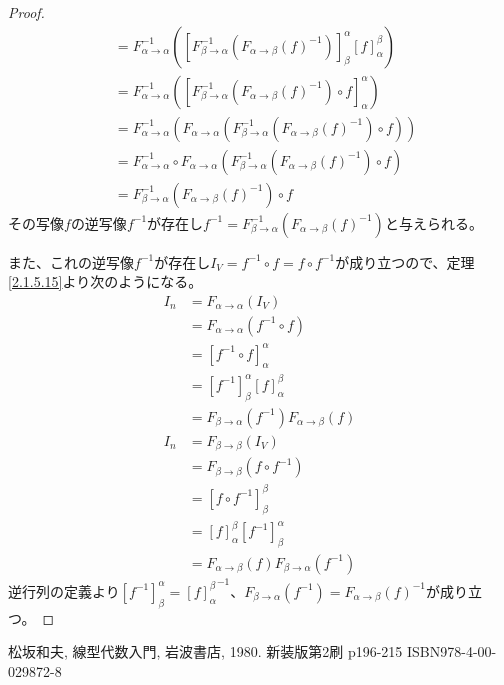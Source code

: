 \documentclass[dvipdfmx]{jsarticle}
\begin{document}
\begin{proof}
\begin{align*}
&= F_{\alpha \rightarrow \alpha}^{- 1}\left( \left[ F_{\beta \rightarrow \alpha}^{- 1}\left( {F_{\alpha \rightarrow \beta}(f)}^{- 1} \right) \right]^{\alpha}_{\beta}[ f]^{\beta}_{\alpha} \right)\\
&= F_{\alpha \rightarrow \alpha}^{- 1}\left( \left[ F_{\beta \rightarrow \alpha}^{- 1}\left( {F_{\alpha \rightarrow \beta}(f)}^{- 1} \right) \circ f \right]_{\alpha}^{\alpha} \right)\\
&= F_{\alpha \rightarrow \alpha}^{- 1}\left( F_{\alpha \rightarrow \alpha}\left( F_{\beta \rightarrow \alpha}^{- 1}\left( {F_{\alpha \rightarrow \beta}(f)}^{- 1} \right) \circ f \right) \right)\\
&= F_{\alpha \rightarrow \alpha}^{- 1} \circ F_{\alpha \rightarrow \alpha}\left( F_{\beta \rightarrow \alpha}^{- 1}\left( {F_{\alpha \rightarrow \beta}(f)}^{- 1} \right) \circ f \right)\\
&= F_{\beta \rightarrow \alpha}^{- 1}\left( {F_{\alpha \rightarrow \beta}(f)}^{- 1} \right) \circ f
\end{align*}
その写像$f$の逆写像$f^{- 1}$が存在し$f^{- 1} = F_{\beta \rightarrow \alpha}^{- 1}\left( {F_{\alpha \rightarrow \beta}(f)}^{- 1} \right)$と与えられる。\par
また、これの逆写像$f^{- 1}$が存在し$I_{V} = f^{- 1} \circ f = f \circ f^{- 1}$が成り立つので、定理\ref{2.1.5.15}より次のようになる。
\begin{align*}
I_{n} &= F_{\alpha \rightarrow \alpha}\left( I_{V} \right)\\
&= F_{\alpha \rightarrow \alpha}\left( f^{- 1} \circ f \right)\\
&= \left[ f^{- 1} \circ f \right]_{\alpha}^{\alpha}\\
&= \left[ f^{- 1} \right]^{\alpha}_{\beta}[ f]^{\beta}_{\alpha}\\
&= F_{\beta \rightarrow \alpha}\left( f^{- 1} \right)F_{\alpha \rightarrow \beta}(f)\\
I_{n} &= F_{\beta \rightarrow \beta}\left( I_{V} \right)\\
&= F_{\beta \rightarrow \beta}\left( f \circ f^{- 1} \right)\\
&= \left[ f \circ f^{-1} \right]_{\beta}^{\beta}\\
&= [ f]^{\beta}_{\alpha}\left[ f^{- 1} \right]^{\alpha}_{\beta}\\
&= F_{\alpha \rightarrow \beta}(f)F_{\beta \rightarrow \alpha}\left( f^{- 1} \right)
\end{align*}
逆行列の定義より$\left[ f^{- 1} \right]^{\alpha}_{\beta} = {[ f]^{\beta}_{\alpha}}^{- 1}$、$F_{\beta \rightarrow \alpha}\left( f^{- 1} \right) = {F_{\alpha \rightarrow \beta}(f)}^{- 1}$が成り立つ。
\end{proof}
\begin{thebibliography}{50}
    松坂和夫, 線型代数入門, 岩波書店, 1980. 新装版第2刷 p196-215 ISBN978-4-00-029872-8
\end{thebibliography}
\end{document}
